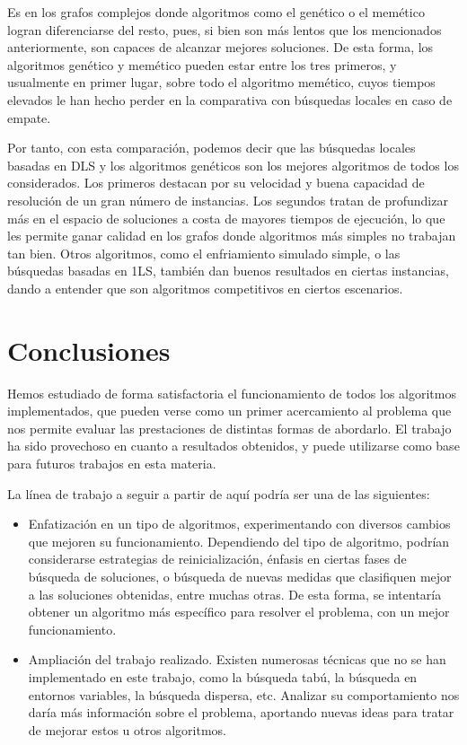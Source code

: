 Es en los grafos complejos donde algoritmos como el genético o el memético logran
diferenciarse del resto, pues, si bien son más lentos que los mencionados anteriormente,
son capaces de alcanzar mejores soluciones. De esta forma, los algoritmos genético y
memético pueden estar entre los tres primeros, y usualmente en primer lugar, sobre
todo el algoritmo memético, cuyos tiempos elevados le han hecho perder en la comparativa
con búsquedas locales en caso de empate.

Por tanto, con esta comparación, podemos decir que las búsquedas locales basadas en
DLS y los algoritmos genéticos son los mejores algoritmos de todos los considerados.
Los primeros destacan por su velocidad y buena capacidad de resolución de un gran
número de instancias. Los segundos tratan de profundizar más en el espacio de soluciones
a costa de mayores tiempos de ejecución, lo que les permite ganar calidad en los grafos
donde algoritmos más simples no trabajan tan bien. Otros algoritmos, como el
enfriamiento simulado simple, o las búsquedas basadas en 1LS, también dan buenos
resultados en ciertas instancias, dando a entender que son algoritmos competitivos
en ciertos escenarios.


\section{Conclusiones}

Hemos estudiado de forma satisfactoria el funcionamiento de todos los algoritmos implementados,
que pueden verse como un primer acercamiento al problema que nos permite evaluar las
prestaciones de distintas formas de abordarlo. El trabajo ha sido provechoso en cuanto
a resultados obtenidos, y puede utilizarse como base para futuros trabajos en esta materia.

La línea de trabajo a seguir a partir de aquí podría ser una de las siguientes:
\begin{itemize}
  \item Enfatización en un tipo de algoritmos, experimentando con diversos cambios que
        mejoren su funcionamiento. Dependiendo del tipo de algoritmo, podrían considerarse
        estrategias de reinicialización, énfasis en ciertas fases de búsqueda de soluciones,
        o búsqueda de nuevas medidas que clasifiquen mejor a las soluciones obtenidas, entre
        muchas otras. De esta forma, se intentaría obtener un algoritmo más específico para
        resolver el problema, con un mejor funcionamiento.

  \item Ampliación del trabajo realizado. Existen numerosas técnicas que no se han implementado
        en este trabajo, como la búsqueda tabú, la búsqueda en entornos variables, la búsqueda
        dispersa, etc. Analizar su comportamiento nos daría más información sobre el problema,
        aportando nuevas ideas para tratar de mejorar estos u otros algoritmos.
\end{itemize}




